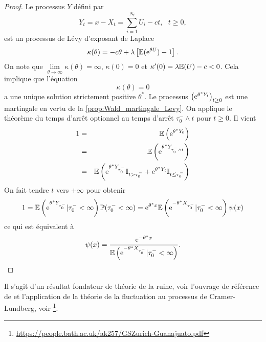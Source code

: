 \begin{proof}
Le processus $Y$ défini par
$$
Y_t = x - X_t = \sum_{i=1}^{N_t}U_i - ct,\text{ }t\geq 0,
$$
est un processus de Lévy d'exposant de Laplace 
$$
\kappa(\theta) = -c\theta+\lambda\left[\mathbb{E}(\mathrm{e}^{\theta U})-1\right].
$$
On note que $\underset{\theta\rightarrow \infty}{\lim}\kappa(\theta) = \infty$, $\kappa(0) = 0$ et $\kappa'(0) = \lambda\mathbb{E}(U)-c<0$. Cela implique que l'équation 
$$
\kappa(\theta)=0
$$
a une unique solution strictement positive $\theta^\ast$. Le processus $\left(\mathrm{e}^{\theta^\ast Y_t}\right)_{t\geq 0}$ est une martingale en vertu de la \cref{prop:Wald_martingale_Levy}. On applique le théorème du temps d'arrêt optionnel au temps d'arrêt $\tau_0^-\land t$ pour $t\geq 0$. Il vient 
\begin{eqnarray*}
1&=&\mathbb{E}\left(\mathrm{e}^{\theta^\ast Y_0}\right)\\
&=&\mathbb{E}\left(\mathrm{e}^{\theta^\ast Y_{\tau_0^-\land t}}\right)\\
&=&\mathbb{E}\left(\mathrm{e}^{\theta^\ast Y_{\tau_0^-}}\mathbb{I}_{t>\tau_0^-}+\mathrm{e}^{\theta^\ast Y_{t}}\mathbb{I}_{t\leq \tau_0^-}\right)\\
\end{eqnarray*}
On fait tendre $t$ vers $+\infty$ pour obtenir
$$
1 = \mathbb{E}\left(\mathrm{e}^{\theta^\ast Y_{\tau_0^-}}|\tau_0^-<\infty\right)\mathbb{P}(\tau_0^-<\infty)=\mathrm{e}^{\theta^\ast x}\mathbb{E}\left(\mathrm{e}^{-\theta^\ast X_{\tau_0^-}}|\tau_0^-<\infty\right)\psi(x)
$$
ce qui est équivalent à 
$$
\psi(x)=\frac{\mathrm{e}^{-\theta^\ast x}}{\mathbb{E}\left(\mathrm{e}^{-\theta^\ast X_{\tau_0^-}}|\tau_0^-<\infty\right)}.
$$

\end{proof}
Il s'agit d'un résultat fondateur de théorie de la ruine, voir l'ouvrage de référence de \citet{Asmussen2010} et l'application de la théorie de la fluctuation au processus de Cramer-Lundberg, voir \citet{Kyprianou2013}\footnote{\url{https://people.bath.ac.uk/ak257/GSZurich-Guanajuato.pdf}}. 
